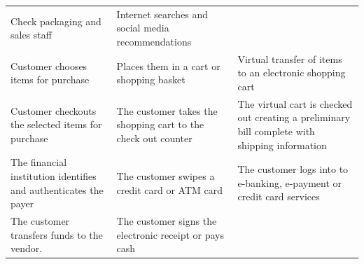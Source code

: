 \documentclass[]{book}
\begin{document}
\begin{longtable}[]{@{}lll@{}}
\begin{minipage}[t]{0.38\columnwidth}
Check packaging and sales staff\strut
\end{minipage} & \begin{minipage}[t]{0.38\columnwidth}\raggedright
Internet searches and social media recommendations\strut
\end{minipage}\tabularnewline
\begin{minipage}[t]{0.15\columnwidth}\raggedright
Customer chooses items for purchase\strut
\end{minipage} & \begin{minipage}[t]{0.38\columnwidth}\raggedright
Places them in a cart or shopping basket\strut
\end{minipage} & \begin{minipage}[t]{0.38\columnwidth}\raggedright
Virtual transfer of items to an electronic shopping cart\strut
\end{minipage}\tabularnewline
\begin{minipage}[t]{0.15\columnwidth}\raggedright
Customer checkouts the selected items for purchase\strut
\end{minipage} & \begin{minipage}[t]{0.38\columnwidth}\raggedright
The customer takes the shopping cart to the check out counter\strut
\end{minipage} & \begin{minipage}[t]{0.38\columnwidth}\raggedright
The virtual cart is checked out creating a preliminary bill complete with shipping information\strut
\end{minipage}\tabularnewline
\begin{minipage}[t]{0.15\columnwidth}\raggedright
The financial institution identifies and authenticates the payer\strut
\end{minipage} & \begin{minipage}[t]{0.38\columnwidth}\raggedright
The customer swipes a credit card or ATM card\strut
\end{minipage} & \begin{minipage}[t]{0.38\columnwidth}\raggedright
The customer logs into to e-banking, e-payment or credit card services\strut
\end{minipage}\tabularnewline
\begin{minipage}[t]{0.15\columnwidth}\raggedright
The customer transfers funds to the vendor.\strut
\end{minipage} & \begin{minipage}[t]{0.38\columnwidth}\raggedright
The customer signs the electronic receipt or pays cash\strut

\end{minipage}
\end{longtable}
\end{document}
